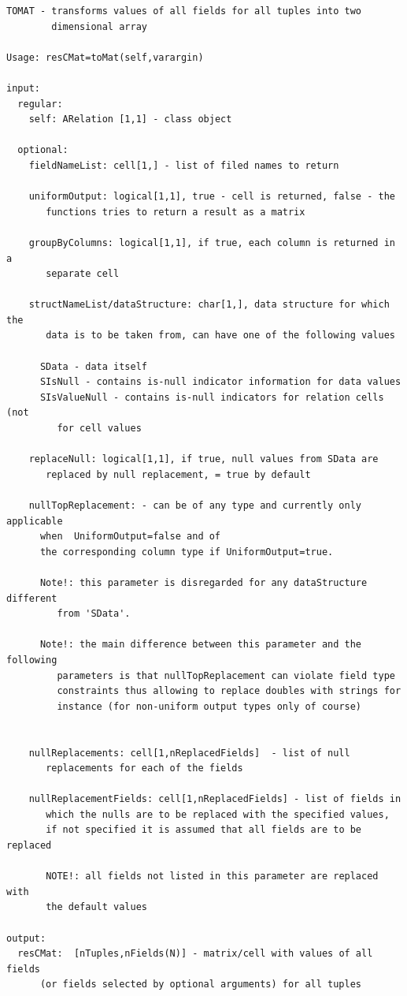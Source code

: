 \documentclass[letterpaper,10pt,english]{sphinxmanual}
\begin{document}
\begin{Verbatim}[commandchars=\\\{\}]
TOMAT - transforms values of all fields for all tuples into two
        dimensional array

Usage: resCMat=toMat(self,varargin)

input:
  regular:
    self: ARelation [1,1] - class object

  optional:
    fieldNameList: cell[1,] - list of filed names to return

    uniformOutput: logical[1,1], true - cell is returned, false - the
       functions tries to return a result as a matrix

    groupByColumns: logical[1,1], if true, each column is returned in a
       separate cell

    structNameList/dataStructure: char[1,], data structure for which the
       data is to be taken from, can have one of the following values

      SData - data itself
      SIsNull - contains is-null indicator information for data values
      SIsValueNull - contains is-null indicators for relation cells (not
         for cell values

    replaceNull: logical[1,1], if true, null values from SData are
       replaced by null replacement, = true by default

    nullTopReplacement: - can be of any type and currently only applicable
      when  UniformOutput=false and of
      the corresponding column type if UniformOutput=true.

      Note!: this parameter is disregarded for any dataStructure different
         from 'SData'.

      Note!: the main difference between this parameter and the following
         parameters is that nullTopReplacement can violate field type
         constraints thus allowing to replace doubles with strings for
         instance (for non-uniform output types only of course)


    nullReplacements: cell[1,nReplacedFields]  - list of null
       replacements for each of the fields

    nullReplacementFields: cell[1,nReplacedFields] - list of fields in
       which the nulls are to be replaced with the specified values,
       if not specified it is assumed that all fields are to be replaced

       NOTE!: all fields not listed in this parameter are replaced with
       the default values

output:
  resCMat:  [nTuples,nFields(N)] - matrix/cell with values of all fields
      (or fields selected by optional arguments) for all tuples
\end{Verbatim}
\end{document}
